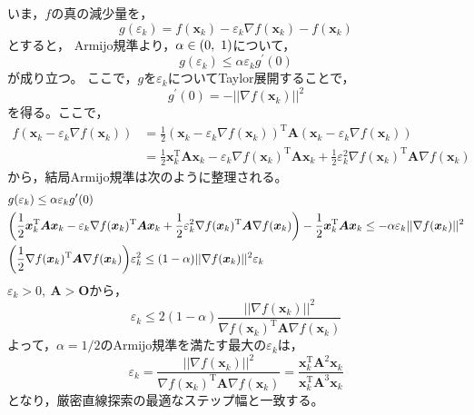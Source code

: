 \documentclass[class=jsarticle, crop=false, dvipdfmx, fleqn]{standalone}
\begin{document}
いま，\(f\)の真の減少量を，
\begin{equation}
    g(\varepsilon_k) = f(\bm{x}_k) - \varepsilon_k \nabla f(\bm{x}_k) - f(\bm{x}_k)
\end{equation}
とすると，
Armijo規準より，\(\alpha \in \qty(0,\ 1)\)について，
\begin{equation}
    g(\varepsilon_k) \le \alpha \varepsilon_k g^\prime (0)
\end{equation}
が成り立つ。
ここで，\(g\)を\(\varepsilon_k\)についてTaylor展開することで，
\begin{equation}
    g^\prime (0) = - ||\nabla f(\bm{x}_k)||^2
\end{equation}
を得る。ここで，
\begin{align}
    f(\bm{x}_k - \varepsilon_k \nabla f(\bm{x}_k))
        & = \frac{1}{2} (\bm{x}_k - \varepsilon_k \nabla f(\bm{x}_k))^\mathrm{T} \bm{A} (\bm{x}_k - \varepsilon_k \nabla f(\bm{x}_k)) \\
        & = \frac{1}{2} \bm{x}_k^\mathrm{T} \bm{A} \bm{x}_k - \varepsilon_k \nabla f(\bm{x}_k)^\mathrm{T} \bm{A} \bm{x}_k + \frac{1}{2} \varepsilon_k^2 \nabla f(\bm{x}_k)^\mathrm{T} \bm{A} \nabla f(\bm{x}_k)
\end{align}
から，結局Armijo規準は次のように整理される。
\begin{align}
    & g(\varepsilon_k) \le \alpha \varepsilon_k g^\prime (0) \\
    & \qty(\frac{1}{2} \bm{x}_k^\mathrm{T} \bm{A} \bm{x}_k - \varepsilon_k \nabla f(\bm{x}_k)^\mathrm{T} \bm{A} \bm{x}_k + \frac{1}{2} \varepsilon_k^2 \nabla f(\bm{x}_k)^\mathrm{T} \bm{A} \nabla f(\bm{x}_k)) - \frac{1}{2} \bm{x}_k^\mathrm{T} \bm{A} \bm{x}_k \le - \alpha \varepsilon_k ||\nabla f(\bm{x}_k)||^2 \\
    & \qty(\frac{1}{2} \nabla f(\bm{x}_k)^\mathrm{T} \bm{A} \nabla f(\bm{x}_k)) \varepsilon_k^2 \le (1 - \alpha) ||\nabla f(\bm{x}_k)||^2 \varepsilon_k
\end{align}
\(\varepsilon_k > 0,\ \bm{A} > \bm{O}\)から，
\begin{equation}
    \varepsilon_k \le 2(1 - \alpha) \frac{||\nabla f(\bm{x}_k)||^2}{\nabla f(\bm{x}_k)^\mathrm{T} \bm{A} \nabla f(\bm{x}_k)}
\end{equation}
よって，\(\alpha = 1/2\)のArmijo規準を満たす最大の\(\varepsilon_k\)は，
\begin{equation}
    \varepsilon_k
        = \frac{||\nabla f(\bm{x}_k)||^2}{\nabla f(\bm{x}_k)^\mathrm{T} \bm{A} \nabla f(\bm{x}_k)}
        = \frac{\bm{x}_k^\mathrm{T} \bm{A}^2 \bm{x}_k}{\bm{x}_k^\mathrm{T} \bm{A}^3 \bm{x}_k}
\end{equation}
となり，厳密直線探索の最適なステップ幅と一致する。
\end{document}
